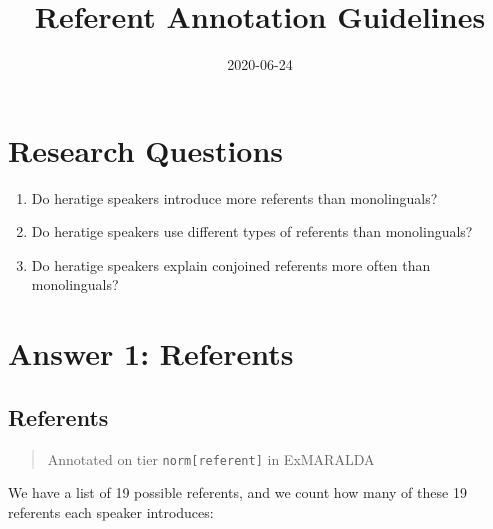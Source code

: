 \documentclass[
]{book}
\title{Referent Annotation Guidelines}
\author{}
\date{\vspace{-2.5em}2020-06-24}
\begin{document}
\maketitle

{
\setcounter{tocdepth}{1}
\tableofcontents
}
\hypertarget{research-questions}{%
\chapter{Research Questions}\label{research-questions}}

\begin{enumerate}
\def\labelenumi{\arabic{enumi}.}
\item
  Do heratige speakers introduce more referents than monolinguals?
\item
  Do heratige speakers use different types of referents than monolinguals?
\item
  Do heratige speakers explain conjoined referents more often than monolinguals?
\end{enumerate}

\hypertarget{answer-1-referents}{%
\chapter{Answer 1: Referents}\label{answer-1-referents}}

\hypertarget{referents}{%
\section{Referents}\label{referents}}

\begin{quote}
Annotated on tier \texttt{norm{[}referent{]}} in ExMARALDA
\end{quote}

We have a list of 19 possible referents, and we count how many of these 19 referents each speaker introduces:
\end{document}
